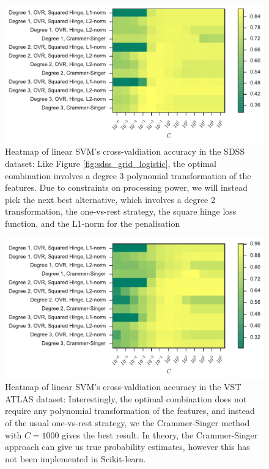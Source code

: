 \begin{figure}[p]
	\centering
	\includegraphics[width=\textwidth]{figures/4_expt1/sdss_grid_poly}
	\caption[Heatmap of linear SVM's cross-valdiation accuracy in SDSS]{
		Heatmap of linear SVM's cross-valdiation accuracy in the SDSS dataset:
		Like Figure \ref{fig:sdss_grid_logistic}, the optimal
		combination involves a degree 3 polynomial transformation of the features.
		Due to constraints on
		processing power, we will instead pick the next best alternative, which involves
		a degree 2 transformation, the one-vs-rest strategy, the square hinge loss function,
		and the L1-norm for the penalisation}
	\label{fig:sdss_grid_poly}
\end{figure}

\begin{figure}[p]
	\centering
	\includegraphics[width=\textwidth]{figures/4_expt1/vstatlas_grid_poly}
	\caption[Heatmap of linear SVM's cross-valdiation accuracy in VST ATLAS]{
		Heatmap of linear SVM's cross-valdiation accuracy in the VST ATLAS dataset:
		Interestingly, the optimal combination does not require any polynomial
		transformation of the features, and instead of the usual one-vs-rest strategy,
		we the Crammer-Singer method
		with $C = 1000$ gives the best result. In theory, the Crammer-Singer approach
		can give us true probability estimates, however this has not been implemented
		in Scikit-learn.}
	\label{fig:vstatlas_grid_poly}
\end{figure}

